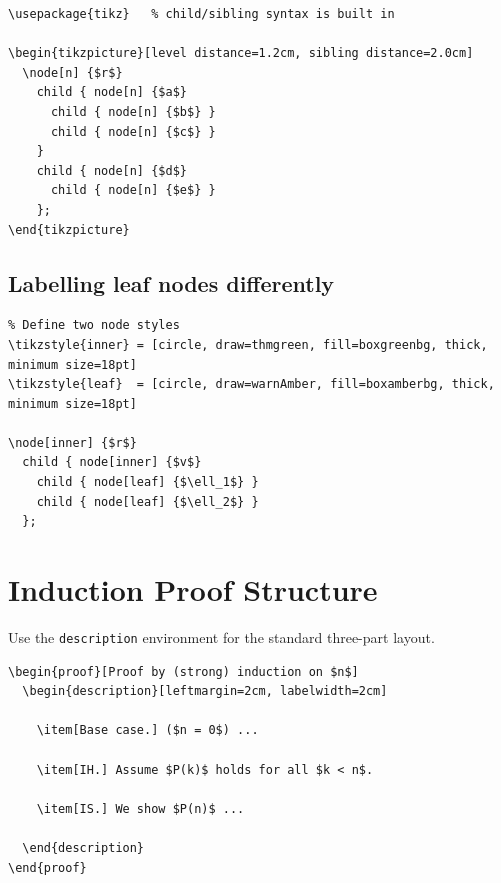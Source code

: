 \documentclass[11pt]{article}
\begin{document}
\begin{lstlisting}
\usepackage{tikz}   % child/sibling syntax is built in

\begin{tikzpicture}[level distance=1.2cm, sibling distance=2.0cm]
  \node[n] {$r$}
    child { node[n] {$a$}
      child { node[n] {$b$} }
      child { node[n] {$c$} }
    }
    child { node[n] {$d$}
      child { node[n] {$e$} }
    };
\end{tikzpicture}
\end{lstlisting}

\subsection{Labelling leaf nodes differently}

\begin{lstlisting}
% Define two node styles
\tikzstyle{inner} = [circle, draw=thmgreen, fill=boxgreenbg, thick, minimum size=18pt]
\tikzstyle{leaf}  = [circle, draw=warnAmber, fill=boxamberbg, thick, minimum size=18pt]

\node[inner] {$r$}
  child { node[inner] {$v$}
    child { node[leaf] {$\ell_1$} }
    child { node[leaf] {$\ell_2$} }
  };
\end{lstlisting}

\section{Induction Proof Structure}

\begin{notebox}
Use the \texttt{description} environment for the standard three-part layout.
\end{notebox}

\begin{lstlisting}
\begin{proof}[Proof by (strong) induction on $n$]
  \begin{description}[leftmargin=2cm, labelwidth=2cm]

    \item[Base case.] ($n = 0$) ...

    \item[IH.] Assume $P(k)$ holds for all $k < n$.

    \item[IS.] We show $P(n)$ ...

  \end{description}
\end{proof}
\end{lstlisting}
\end{document}
